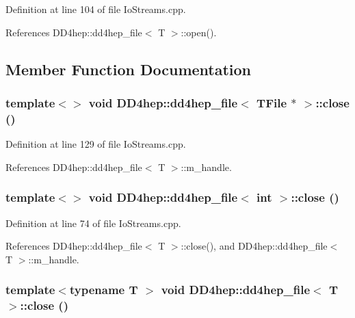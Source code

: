 Definition at line 104 of file IoStreams.cpp.

References DD4hep::dd4hep\_\-file$<$ T $>$::open().

\subsection{Member Function Documentation}
\hypertarget{class_d_d4hep_1_1dd4hep__file_a9ff7065205d26c640fff6923fc50485d}{
\subsubsection[{close}]{\setlength{\rightskip}{0pt plus 5cm}template$<$$>$ void {\bf DD4hep::dd4hep\_\-file}$<$ TFile $\ast$ $>$::close ()}}
\label{class_d_d4hep_1_1dd4hep__file_a9ff7065205d26c640fff6923fc50485d}


Definition at line 129 of file IoStreams.cpp.

References DD4hep::dd4hep\_\-file$<$ T $>$::m\_\-handle.\hypertarget{class_d_d4hep_1_1dd4hep__file_af2e625a13f1d378114bb18cd9724ad4e}{
\subsubsection[{close}]{\setlength{\rightskip}{0pt plus 5cm}template$<$$>$ void {\bf DD4hep::dd4hep\_\-file}$<$ int $>$::close ()}}
\label{class_d_d4hep_1_1dd4hep__file_af2e625a13f1d378114bb18cd9724ad4e}


Definition at line 74 of file IoStreams.cpp.

References DD4hep::dd4hep\_\-file$<$ T $>$::close(), and DD4hep::dd4hep\_\-file$<$ T $>$::m\_\-handle.\hypertarget{class_d_d4hep_1_1dd4hep__file_afdabf56b0a0af86b2199e075ab1b2499}{
\subsubsection[{close}]{\setlength{\rightskip}{0pt plus 5cm}template$<$typename T $>$ void {\bf DD4hep::dd4hep\_\-file}$<$ {\bf T} $>$::close ()}}
\label{class_d_d4hep_1_1dd4hep__file_afdabf56b0a0af86b2199e075ab1b2499}



